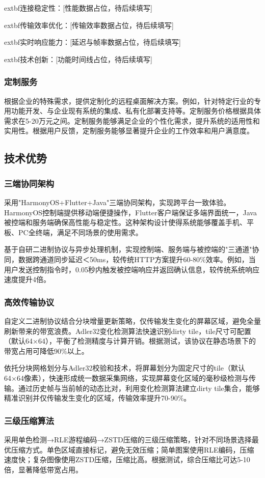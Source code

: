 \documentclass[12pt,a4paper]{article}
\begin{document}
	extbf{连接稳定性：}[性能数据占位，待后续填写]

	extbf{传输效率优化：}[传输效率数据占位，待后续填写]

	extbf{实时响应能力：}[延迟与帧率数据占位，待后续填写]

	extbf{技术创新：}[功能时间线占位，待后续填写]
\subsubsection{定制服务}
根据企业的特殊需求，提供定制化的远程桌面解决方案。例如，针对特定行业的专用功能开发、与企业现有系统的集成、私有化部署支持等。定制服务价格根据具体需求在5-20万元之间。定制服务能够满足企业的个性化需求，提升系统的适用性和实用性。根据用户反馈，定制服务能够显著提升企业的工作效率和用户满意度。

\subsection{技术优势}

\subsubsection{三端协同架构}
采用"HarmonyOS+Flutter+Java"三端协同架构，实现跨平台一致体验。HarmonyOS控制端提供移动端便捷操作，Flutter客户端保证多端界面统一，Java被控端和服务端确保高性能与稳定性。这种架构设计使得系统能够覆盖手机、平板、PC全终端，满足不同场景的使用需求。

基于自研二进制协议与异步处理机制，实现控制端、服务端与被控端的"三通道"协同，数据跨通道同步延迟＜50ms，较传统HTTP方案提升60-80\%效率。例如，当用户发送控制指令时，0.05秒内触发被控端响应并返回确认信息，较传统系统响应速度提升4倍。

\subsubsection{高效传输协议}
自定义二进制协议结合分块增量更新策略，仅传输发生变化的屏幕区域，避免全量刷新带来的带宽浪费。Adler32变化检测算法快速识别dirty tile，tile尺寸可配置（默认64×64），平衡了检测精度与计算开销。根据测试，该协议在静态场景下的带宽占用可降低90\%以上。

依托分块网格划分与Adler32校验和技术，将屏幕划分为固定尺寸的tile（默认64×64像素），快速形成统一数据采集网络，实现屏幕变化区域的毫秒级检测与传输。通过历史帧与当前帧的动态比对，利用变化检测算法建立dirty tile集合，能够精准识别并仅传输发生变化的区域，传输效率提升70-90\%。

\subsubsection{三级压缩算法}
采用单色检测→RLE游程编码→ZSTD压缩的三级压缩策略，针对不同场景选择最优压缩方式。单色区域直接标记，避免无效压缩；简单图案使用RLE编码，压缩速度快；复杂图像使用ZSTD压缩，压缩比高。根据测试，综合压缩比可达5-10倍，显著降低带宽占用。
\end{document}
